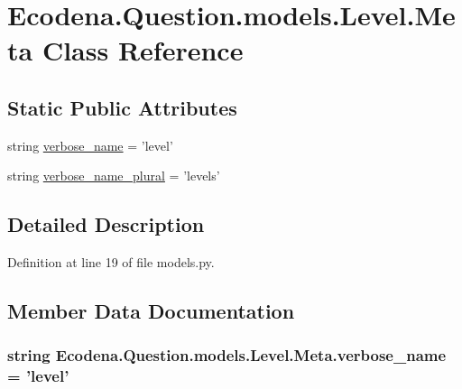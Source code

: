 \hypertarget{class_ecodena_1_1_question_1_1models_1_1_level_1_1_meta}{
\section{Ecodena.Question.models.Level.Meta Class Reference}
\label{dd/dc4/class_ecodena_1_1_question_1_1models_1_1_level_1_1_meta}
}
\subsection*{Static Public Attributes}
\begin{DoxyCompactItemize}
\item 
string \hyperlink{class_ecodena_1_1_question_1_1models_1_1_level_1_1_meta_a1fd3ff0fe1df95529bf7c74fe72fea51}{verbose\_\-name} = 'level'
\item 
string \hyperlink{class_ecodena_1_1_question_1_1models_1_1_level_1_1_meta_a0bcd87e70ea14c111af94c17deb2257e}{verbose\_\-name\_\-plural} = 'levels'
\end{DoxyCompactItemize}


\subsection{Detailed Description}


Definition at line 19 of file models.py.



\subsection{Member Data Documentation}
\hypertarget{class_ecodena_1_1_question_1_1models_1_1_level_1_1_meta_a1fd3ff0fe1df95529bf7c74fe72fea51}{
\subsubsection[{verbose\_\-name}]{\setlength{\rightskip}{0pt plus 5cm}string {\bf Ecodena.Question.models.Level.Meta.verbose\_\-name} = 'level'}}
\label{dd/dc4/class_ecodena_1_1_question_1_1models_1_1_level_1_1_meta_a1fd3ff0fe1df95529bf7c74fe72fea51}


